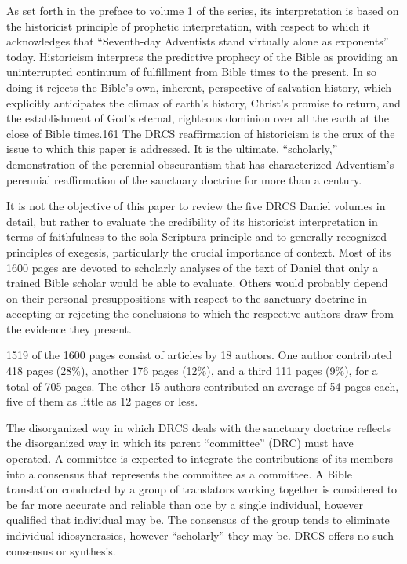 As set forth in the preface to volume 1 of the series, its interpretation is
based on the historicist principle of prophetic interpretation, with respect
to which it acknowledges that ``Seventh-day Adventists stand virtually alone
as exponents'' today. Historicism interprets the predictive prophecy of the
Bible as providing an uninterrupted continuum of fulfillment from Bible
times to the present. In so doing it rejects the Bible's own, inherent,
perspective of salvation history, which explicitly anticipates the climax of
earth's history, Christ's promise to return, and the establishment of God's
eternal, righteous dominion over all the earth at the close of Bible
times.161 The DRCS reaffirmation of historicism is the crux of the issue to
which this paper is addressed. It is the ultimate, ``scholarly,''
demonstration of the perennial obscurantism that has characterized
Adventism's perennial reaffirmation of the sanctuary doctrine for more than
a century.

It is not the objective of this paper to review the five DRCS Daniel volumes
in detail, but rather to evaluate the credibility of its historicist
interpretation in terms of faithfulness to the sola Scriptura principle and
to generally recognized principles of exegesis, particularly the crucial
importance of context. Most of its 1600 pages are devoted to scholarly
analyses of the text of Daniel that only a trained Bible scholar would be
able to evaluate. Others would probably depend on their personal
presuppositions with respect to the sanctuary doctrine in accepting or
rejecting the conclusions to which the respective authors draw from the
evidence they present.

1519 of the 1600 pages consist of articles by 18 authors. One author
contributed 418 pages (28\%), another 176 pages (12\%), and a third 111 pages
(9\%), for a total of 705 pages. The other 15 authors contributed an average
of 54 pages each, five of them as little as 12 pages or less.

The disorganized way in which DRCS deals with the sanctuary doctrine
reflects the disorganized way in which its parent ``committee'' (DRC) must
have operated. A committee is expected to integrate the contributions of its
members into a consensus that represents the committee as a committee. A
Bible translation conducted by a group of translators working together is
considered to be far more accurate and reliable than one by a single
individual, however qualified that individual may be. The consensus of the
group tends to eliminate individual idiosyncrasies, however ``scholarly'' they
may be. DRCS offers no such consensus or synthesis.

